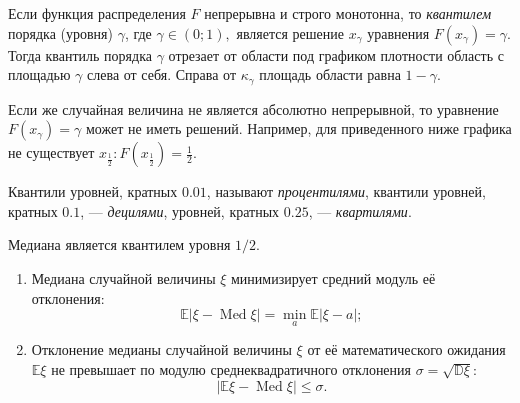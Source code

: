\begin{rmrk}
    Если функция распределения $F$ непрерывна и строго монотонна, то \textit{квантилем} порядка (уровня) $\gamma$, где $\gamma \in (0; 1), $ является решение $x_\gamma$ уравнения $F(x_\gamma) = \gamma.$ 
    Тогда квантиль порядка $\gamma$ отрезает от области под графиком плотности область с площадью $\gamma$ слева от себя. Справа от $\kappa_\gamma$ площадь области равна $1 - \gamma$.
    
    Если же случайная величина не является абсолютно непрерывной, то уравнение $F(x_\gamma) = \gamma$ может не иметь решений. Например, для приведенного ниже графика не существует $x_{\frac{1}{2}}: F(x_{\frac{1}{2}}) = \frac{1}{2}$.
        
    \medskip\hfill\break
    \begin{center}
    \end{center}
\end{rmrk} 

\begin{defn}
    Квантили уровней, кратных $0.01$, называют \textit{процентилями}, квантили уровней, кратных $0.1$, — \textit{децилями}, уровней, кратных $0.25$, — \textit{квартилями}.
\end{defn} 

\begin{rmrk}
    Медиана является квантилем уровня $1 / 2$.
\end{rmrk} 

\begin{namedthm}\leavevmode
\begin{enumerate}
    \item Медиана случайной величины $\xi$ минимизирует средний модуль её отклонения:
    \begin{equation*}
        \mathbb{E}|\xi - \operatorname{Med} \xi| 
    = \min _{a} \mathbb{E}|\xi-a|;
    \end{equation*}
    \item Отклонение медианы случайной величины $\xi$ от её математического ожидания $\mathbb{E}\xi$ не превышает по модулю среднеквадратичного отклонения $\sigma = \sqrt{\mathbb{D}\xi}$:
    \begin{equation*}
        |\mathbb{E}\xi - \operatorname{Med}\xi| \leqslant \sigma.
    \end{equation*}
\end{enumerate}
\end{namedthm}

